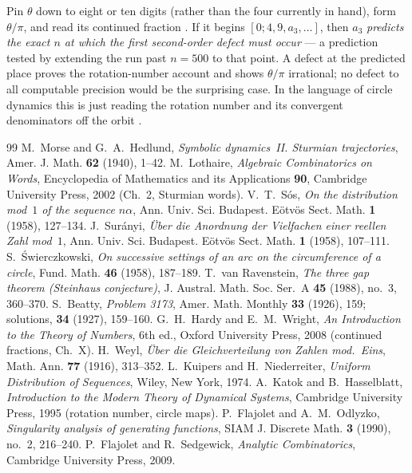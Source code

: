 \documentclass[11pt]{amsart}
\begin{document}
Pin $\theta$ down to eight or ten digits (rather than the four currently in hand), form
$\theta/\pi$, and read its continued fraction \cite{HardyWright}. If it begins
$[0;4,9,a_3,\dots]$, then $a_3$ \emph{predicts the exact $n$ at which the first second-order
defect must occur} --- a prediction tested by extending the run past $n=500$ to that point.
A defect at the predicted place proves the rotation-number account and shows $\theta/\pi$
irrational; no defect to all computable precision would be the surprising case. In the
language of circle dynamics this is just reading the rotation number and its convergent
denominators off the orbit \cite{KatokHasselblatt1995}.

\begin{thebibliography}{99}
 M.~Morse and G.~A.~Hedlund, \emph{Symbolic dynamics~II. Sturmian
  trajectories}, Amer. J. Math. \textbf{62} (1940), 1--42.
 M.~Lothaire, \emph{Algebraic Combinatorics on Words}, Encyclopedia of
  Mathematics and its Applications \textbf{90}, Cambridge University Press, 2002 (Ch.~2,
  Sturmian words).
 V.~T.~S\'os, \emph{On the distribution mod~$1$ of the sequence $n\alpha$},
  Ann. Univ. Sci. Budapest. E\"otv\"os Sect. Math. \textbf{1} (1958), 127--134.
 J.~Sur\'anyi, \emph{\"Uber die Anordnung der Vielfachen einer reellen
  Zahl mod~$1$}, Ann. Univ. Sci. Budapest. E\"otv\"os Sect. Math. \textbf{1} (1958),
  107--111.
 S.~\'Swierczkowski, \emph{On successive settings of an arc on the
  circumference of a circle}, Fund. Math. \textbf{46} (1958), 187--189.
 T.~van Ravenstein, \emph{The three gap theorem (Steinhaus
  conjecture)}, J. Austral. Math. Soc. Ser.~A \textbf{45} (1988), no.~3, 360--370.
 S.~Beatty, \emph{Problem 3173}, Amer. Math. Monthly \textbf{33} (1926),
  159; solutions, \textbf{34} (1927), 159--160.
 G.~H.~Hardy and E.~M.~Wright, \emph{An Introduction to the Theory of
  Numbers}, 6th ed., Oxford University Press, 2008 (continued fractions, Ch.~X).
 H.~Weyl, \emph{\"Uber die Gleichverteilung von Zahlen mod.~Eins}, Math.
  Ann. \textbf{77} (1916), 313--352.
 L.~Kuipers and H.~Niederreiter, \emph{Uniform Distribution
  of Sequences}, Wiley, New York, 1974.
 A.~Katok and B.~Hasselblatt, \emph{Introduction to the Modern
  Theory of Dynamical Systems}, Cambridge University Press, 1995 (rotation number, circle
  maps).
 P.~Flajolet and A.~M.~Odlyzko, \emph{Singularity analysis of
  generating functions}, SIAM J. Discrete Math. \textbf{3} (1990), no.~2, 216--240.
 P.~Flajolet and R.~Sedgewick, \emph{Analytic Combinatorics},
  Cambridge University Press, 2009.
\end{thebibliography}
\end{document}
